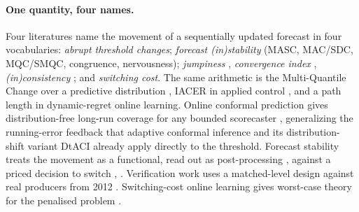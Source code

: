 \paragraph{One quantity, four names.} Four literatures name the movement of a
sequentially updated forecast in four vocabularies: \emph{abrupt threshold changes};
\emph{forecast (in)stability} (MASC, MAC/SDC, MQC/SMQC, congruence, nervousness);
\emph{jumpiness} \citep{zsoter2009jumpiness}, \emph{convergence index}
\citep{ehret2010convergence}, \emph{(in)consistency} \citep{pappenberger2011consistency}; and
\emph{switching cost}. The same arithmetic is the Multi-Quantile Change over a predictive
distribution \citep[v3, \S3.4.1]{zanotti2026smqc}, IACER in applied control
\citep{sarhadi2025criteria}, and a path length in dynamic-regret online learning.
Online conformal prediction gives distribution-free long-run coverage for any
bounded scorecaster \citep[Thm~1, Prop.~2]{angelopoulos2023pid}, generalizing the running-error
feedback that adaptive conformal inference \citep{gibbs2021aci} and its distribution-shift variant
DtACI \citep{gibbs2024dtaci} already apply directly to the threshold.
Forecast stability
treats the movement as a functional, read out as post-processing
\citep[Eq.~3]{godahewa2025stability}, against a priced decision to switch
\citep[\S4.2]{genov2026switching}, \citep{vanbelle2026stabilizing}. Verification work uses a
matched-level design against real producers from 2012
\citep{pinson2012scenarios,worsnop2018scenarios}. Switching-cost online learning gives
worst-case theory for the penalised problem \citep[Thm~2]{andrew2013twometrics}.

